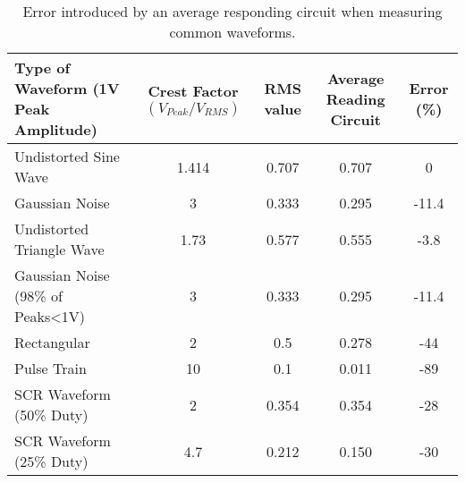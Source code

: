\documentclass[10pt]{article}
\begin{document}
\begin{multicols*}{2}
                    \begin{table*}[!th]
                        \centering
                        \begin{tabularx}{\textwidth}{|l*{4}{|C}|}
                            \hline
                            Type of Waveform (1V Peak Amplitude) & Crest Factor $(V_{Peak}/V_{RMS})$ & RMS value & Average Reading Circuit & Error (\%) \\ \hline
                            Undistorted Sine Wave & 1.414 & 0.707 & 0.707 & 0 \\    \hline
                            Gaussian Noise & 3 & 0.333 & 0.295 & -11.4 \\   \hline
                            Undistorted Triangle Wave & 1.73 & 0.577 & 0.555 & -3.8 \\   \hline
                            Gaussian Noise (98\% of Peaks<1V) & 3 & 0.333 & 0.295 & -11.4 \\    \hline
                            Rectangular & 2 & 0.5 & 0.278 & -44 \\    \hline
                            Pulse Train & 10 & 0.1 & 0.011 & -89 \\    \hline
                            SCR Waveform (50\% Duty) & 2 & 0.354 & 0.354 & -28 \\    \hline
                            SCR Waveform (25\% Duty) & 4.7 & 0.212 & 0.150 & -30 \\    \hline
                        \end{tabularx}
                        \caption{Error introduced by an average responding circuit when measuring common waveforms.}
                        \label{table:ave-err}
                    \end{table*}
                    

\end{multicols*}
\end{document}
